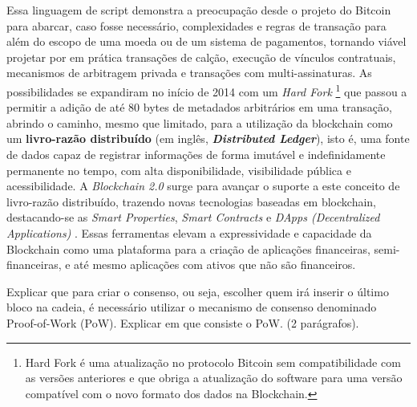 \documentclass[a4paper,11pt]{article}
\begin{document}
Essa linguagem de script demonstra a preocupação desde o projeto do Bitcoin para abarcar, caso fosse necessário, complexidades e regras de transação para além do escopo de uma moeda ou de um sistema de pagamentos, tornando viável projetar por em prática transações de calção, execução de vínculos contratuais, mecanismos de arbitragem privada e transações com multi-assinaturas.
As possibilidades se expandiram no início de 2014 \cite{Greenspan2015} com um \emph{Hard Fork}
\footnote{Hard Fork é uma atualização no protocolo Bitcoin sem compatibilidade com as versões anteriores e que obriga a atualização do software para uma versão compatível com o novo formato dos dados na Blockchain.}
que passou a permitir a adição de até 80 bytes de metadados arbitrários em uma transação, abrindo o caminho, mesmo que limitado, para a utilização da blockchain como um \textbf{livro-razão distribuído} (em inglês, \textbf{\textit{Distributed Ledger}}), isto é, uma fonte de dados capaz de registrar informações de forma imutável e indefinidamente permanente no tempo, com alta disponibilidade, visibilidade pública e acessibilidade.
A \emph{Blockchain 2.0} surge para avançar o suporte a este conceito de livro-razão distribuído, trazendo novas tecnologias baseadas em blockchain, destacando-se as \emph{Smart Properties}, \emph{Smart Contracts} e \emph{DApps (Decentralized Applications)} \cite{Swan2015}.
Essas ferramentas elevam a expressividade e capacidade da Blockchain como uma plataforma para a criação de aplicações financeiras, semi-financeiras, e até mesmo aplicações com ativos que não são financeiros.


{\color{ForestGreen}Explicar que para criar o consenso, ou seja, escolher quem irá inserir o último bloco na cadeia, é necessário utilizar o mecanismo de consenso denominado Proof-of-Work (PoW). Explicar em que consiste o PoW. (2 parágrafos).}

%  
\end{document}
